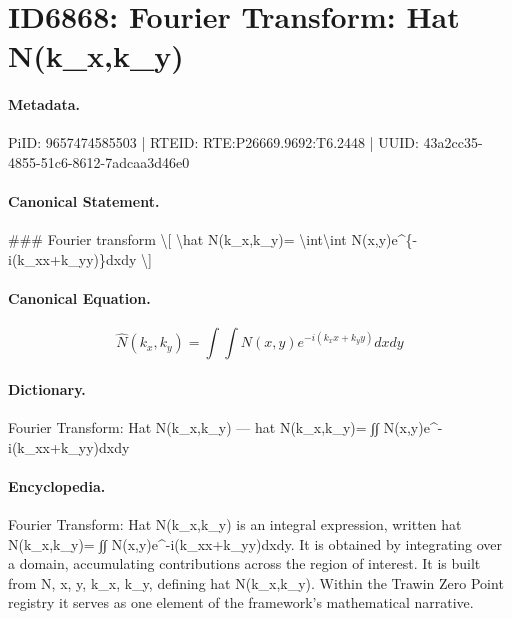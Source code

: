 \section*{ID6868: Fourier Transform: Hat N(k\_x,k\_y)}
\paragraph{Metadata.}
PiID: 9657474585503 | RTEID: RTE:P26669.9692:T6.2448 | UUID: 43a2cc35-4855-51c6-8612-7adcaa3d46e0

\paragraph{Canonical Statement.}
\#\#\# Fourier transform \textbackslash{}[ \textbackslash{}hat N(k\_x,k\_y)= \textbackslash{}int\textbackslash{}int N(x,y)e\textasciicircum{}\{-i(k\_xx+k\_yy)\}dxdy \textbackslash{}]

\paragraph{Canonical Equation.}
\[
\hat N(k_x,k_y)= \int\int N(x,y)e^{-i(k_xx+k_yy)}dxdy
\]

\paragraph{Dictionary.}
Fourier Transform: Hat N(k\_x,k\_y) — hat N(k\_x,k\_y)= ∫∫ N(x,y)e\textasciicircum{}-i(k\_xx+k\_yy)dxdy

\paragraph{Encyclopedia.}
Fourier Transform: Hat N(k\_x,k\_y) is an integral expression, written hat N(k\_x,k\_y)= ∫∫ N(x,y)e\textasciicircum{}-i(k\_xx+k\_yy)dxdy. It is obtained by integrating over a domain, accumulating contributions across the region of interest. It is built from N, x, y, k\_x, k\_y, defining hat N(k\_x,k\_y). Within the Trawin Zero Point registry it serves as one element of the framework's mathematical narrative.
